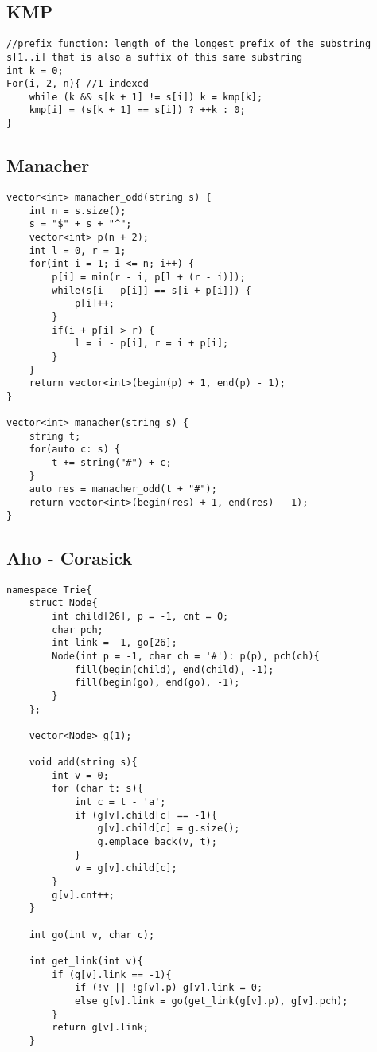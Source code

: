 \documentclass[11pt,a4paper]{article}
\begin{document}
\begin{multicols*}{2}
\subsection{KMP}
\begin{lstlisting}
//prefix function: length of the longest prefix of the substring s[1..i] that is also a suffix of this same substring
int k = 0;
For(i, 2, n){ //1-indexed
    while (k && s[k + 1] != s[i]) k = kmp[k];
    kmp[i] = (s[k + 1] == s[i]) ? ++k : 0;
}
\end{lstlisting}

\subsection{Manacher}
\begin{lstlisting}
vector<int> manacher_odd(string s) {
    int n = s.size();
    s = "$" + s + "^";
    vector<int> p(n + 2);
    int l = 0, r = 1;
    for(int i = 1; i <= n; i++) {
        p[i] = min(r - i, p[l + (r - i)]);
        while(s[i - p[i]] == s[i + p[i]]) {
            p[i]++;
        }
        if(i + p[i] > r) {
            l = i - p[i], r = i + p[i];
        }
    }
    return vector<int>(begin(p) + 1, end(p) - 1);
}

vector<int> manacher(string s) {
    string t;
    for(auto c: s) {
        t += string("#") + c;
    }
    auto res = manacher_odd(t + "#");
    return vector<int>(begin(res) + 1, end(res) - 1);
}
\end{lstlisting}

\subsection{Aho - Corasick}
\begin{lstlisting}
namespace Trie{
	struct Node{
		int child[26], p = -1, cnt = 0;
		char pch;
		int link = -1, go[26];
		Node(int p = -1, char ch = '#'): p(p), pch(ch){
			fill(begin(child), end(child), -1);
        	fill(begin(go), end(go), -1);
		}
	};
	
	vector<Node> g(1);
	
	void add(string s){
		int v = 0;
		for (char t: s){
			int c = t - 'a';
			if (g[v].child[c] == -1){
				g[v].child[c] = g.size();
				g.emplace_back(v, t);
			}
			v = g[v].child[c];
		}
		g[v].cnt++;
	}
	
	int go(int v, char c);
	
	int get_link(int v){
		if (g[v].link == -1){
			if (!v || !g[v].p) g[v].link = 0;
			else g[v].link = go(get_link(g[v].p), g[v].pch);
		}
		return g[v].link;
	}
	

\end{lstlisting}
\end{multicols*}
\end{document}
